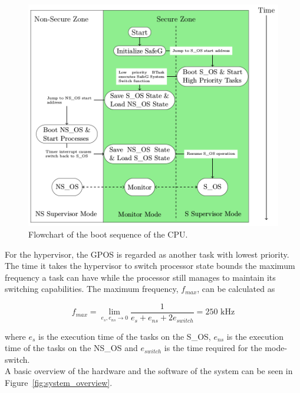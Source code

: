 \begin{figure}[H]
\centering
\includegraphics[width=\textwidth]{./img/literature_modeswitch.png}
\caption{Flowchart of the boot sequence of the CPU. \cite{zaki2016}}\label{fig:modeswitch}
\end{figure}

For the hypervisor, the GPOS is regarded as another task with lowest priority. \\

The time it takes the hypervisor to switch processor state bounds the maximum frequency a task can have while the processor still manages to maintain its switching capabilities. The maximum frequency, $f_{max}$, can be calculated as

$$f_{max} = \lim_{e_s, e_{ns} \to 0} \frac{1}{e_s+e_{ns}+2e_{switch}} = 250\textrm{ kHz}$$

where $e_s$ is the execution time of the tasks on the S\_OS, $e_{ns}$ is the execution time of the tasks on the NS\_OS and $e_{switch}$ is the time required for the mode-switch.\\

A basic overview of the hardware and the software of the system can be seen in Figure~\ref{fig:system_overview}.


